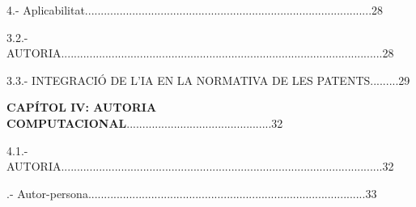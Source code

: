 \documentclass[12pt]{article}
\begin{document}
\vspace{\baselineskip}
\begin{adjustwidth}{0.49in}{0.0in}
\begin{justify}
4.- Aplicabilitat...........................................................................................28
\end{justify}\par

\end{adjustwidth}


\vspace{\baselineskip}
\begin{justify}
3.2.- AUTORIA......................................................................................................28
\end{justify}\par


\vspace{\baselineskip}
\begin{justify}
3.3.- INTEGRACIÓ DE L’IA EN LA NORMATIVA DE LES PATENTS.........29
\end{justify}\par


\vspace{\baselineskip}

\vspace{\baselineskip}
\begin{justify}
\textbf{CAPÍTOL IV: AUTORIA COMPUTACIONAL}..............................................32
\end{justify}\par


\vspace{\baselineskip}

\vspace{\baselineskip}
\begin{justify}
4.1.- AUTORIA......................................................................................................32
\end{justify}\par


\vspace{\baselineskip}

\vspace{\baselineskip}
\begin{justify}
.- Autor-persona........................................................................................33
\end{justify}\par
\end{document}
